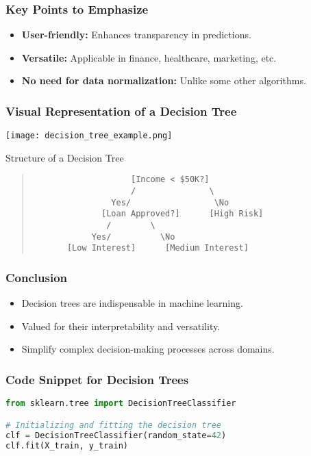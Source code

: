 \documentclass{beamer}
\begin{document}
\begin{frame}[fragile]
    \frametitle{Key Points to Emphasize}
    \begin{itemize}
        \item \textbf{User-friendly:} Enhances transparency in predictions.
        \item \textbf{Versatile:} Applicable in finance, healthcare, marketing, etc.
        \item \textbf{No need for data normalization:} Unlike some other algorithms.
    \end{itemize}
\end{frame}

\begin{frame}[fragile]
    \frametitle{Visual Representation of a Decision Tree}
    \begin{center}
        \texttt{[image: decision\_tree\_example.png]} %
    \end{center}
    \begin{block}{Structure of a Decision Tree}
    \begin{quote}
    \begin{verbatim}
                    [Income < $50K?]
                    /               \
                Yes/                 \No
              [Loan Approved?]      [High Risk]
               /        \
            Yes/          \No
       [Low Interest]      [Medium Interest]
    \end{verbatim}
    \end{quote}
    \end{block}
\end{frame}

\begin{frame}[fragile]
    \frametitle{Conclusion}
    \begin{itemize}
        \item Decision trees are indispensable in machine learning.
        \item Valued for their interpretability and versatility.
        \item Simplify complex decision-making processes across domains.
    \end{itemize}
\end{frame}

\begin{frame}[fragile]
    \frametitle{Code Snippet for Decision Trees}
    \begin{lstlisting}[language=Python]
from sklearn.tree import DecisionTreeClassifier

# Initializing and fitting the decision tree
clf = DecisionTreeClassifier(random_state=42)
clf.fit(X_train, y_train)
    \end{lstlisting}
\end{frame}
\end{document}
